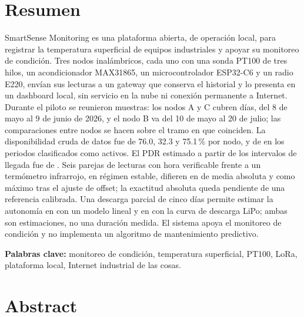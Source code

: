 \chapter*{Resumen}

SmartSense Monitoring es una plataforma abierta, de operación local, para registrar la temperatura superficial de equipos industriales y apoyar su monitoreo de condición. Tres nodos inalámbricos, cada uno con una sonda PT100 de tres hilos, un acondicionador MAX31865, un microcontrolador ESP32-C6 y un radio E220, envían sus lecturas a un gateway que conserva el historial y lo presenta en un dashboard local, sin servicio en la nube ni conexión permanente a Internet. Durante el piloto se reunieron \TotalMuestras{} muestras: los nodos A y C cubren \DuracionComunDias{} días, del 8 de mayo al 9 de junio de 2026, y el nodo B va del 10 de mayo al 20 de julio; las comparaciones entre nodos se hacen sobre el tramo en que coinciden. La disponibilidad cruda de datos fue de 76.0, 32.3 y 75.1\,\% por nodo, y de \DisponibilidadEnlace{} en los periodos clasificados como activos. El PDR estimado a partir de los intervalos de llegada fue de \PDREstimado{}. Seis parejas de lecturas con hora verificable frente a un termómetro infrarrojo, en régimen estable, difieren en \DiferenciaTermicaMedia{} de media absoluta y \DiferenciaTermicaMaxima{} como máximo tras el ajuste de offset; la exactitud absoluta queda pendiente de una referencia calibrada. Una descarga parcial de cinco días permite estimar la autonomía en \AutonomiaLinealEstimada{} con un modelo lineal y en \AutonomiaModeloEstimada{} con la curva de descarga LiPo; ambas son estimaciones, no una duración medida. El sistema apoya el monitoreo de condición y no implementa un algoritmo de mantenimiento predictivo.

\noindent\textbf{Palabras clave:} monitoreo de condición, temperatura superficial, PT100, LoRa, plataforma local, Internet industrial de las cosas.

\clearpage
\chapter*{Abstract}


